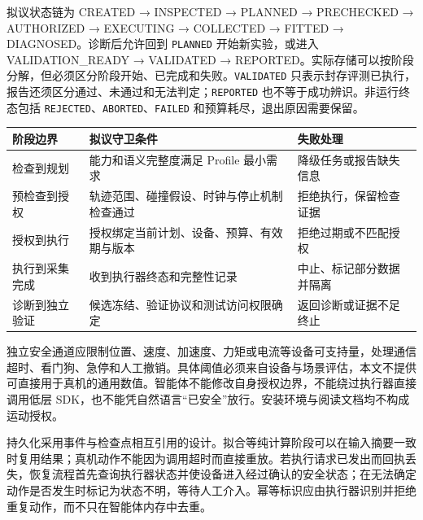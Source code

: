 \documentclass[
  chinese,
  11pt,
  a4paper,
  fontset=fandol]{ctexart}
\newcounter{none} %
\begin{document}
拟议状态链为 CREATED → INSPECTED → PLANNED → PRECHECKED → AUTHORIZED →
EXECUTING → COLLECTED → FITTED → DIAGNOSED。诊断后允许回到
\texttt{PLANNED} 开始新实验，或进入 VALIDATION\_READY → VALIDATED →
REPORTED。实际存储可以按阶段分解，但必须区分阶段开始、已完成和失败。\texttt{VALIDATED}
只表示封存评测已执行，报告还须区分通过、未通过和无法判定；\texttt{REPORTED}
也不等于成功辨识。非运行终态包括
\texttt{REJECTED}、\texttt{ABORTED}、\texttt{FAILED}
和预算耗尽，退出原因需要保留。

{\def\LTcaptype{none} %
\begin{longtable}[]{@{}
  >{\raggedright\arraybackslash}p{}
  >{\raggedright\arraybackslash}p{}
  >{\raggedright\arraybackslash}p{}@{}}
\toprule\noalign{}
\begin{minipage}[b]{\linewidth}\raggedright
阶段边界
\end{minipage} & \begin{minipage}[b]{\linewidth}\raggedright
拟议守卫条件
\end{minipage} & \begin{minipage}[b]{\linewidth}\raggedright
失败处理
\end{minipage} \\
\midrule\noalign{}
\endhead
\bottomrule\noalign{}
\endlastfoot
检查到规划 & 能力和语义完整度满足 Profile 最小需求 &
降级任务或报告缺失信息 \\
预检查到授权 & 轨迹范围、碰撞假设、时钟与停止机制检查通过 &
拒绝执行，保留检查证据 \\
授权到执行 & 授权绑定当前计划、设备、预算、有效期与版本 &
拒绝过期或不匹配授权 \\
执行到采集完成 & 收到执行器终态和完整性记录 &
中止、标记部分数据并隔离 \\
诊断到独立验证 & 候选冻结、验证协议和测试访问权限确定 &
返回诊断或证据不足终止 \\
\end{longtable}
}

独立安全通道应限制位置、速度、加速度、力矩或电流等设备可支持量，处理通信超时、看门狗、急停和人工撤销。具体阈值必须来自设备与场景评估，本文不提供可直接用于真机的通用数值。智能体不能修改自身授权边界，不能绕过执行器直接调用低层
SDK，也不能凭自然语言``已安全''放行。安装环境与阅读文档均不构成运动授权。

持久化采用事件与检查点相互引用的设计。拟合等纯计算阶段可以在输入摘要一致时复用结果；真机动作不能因为调用超时而直接重放。若执行请求已发出而回执丢失，恢复流程首先查询执行器状态并使设备进入经过确认的安全状态；在无法确定动作是否发生时标记为状态不明，等待人工介入。幂等标识应由执行器识别并拒绝重复动作，而不只在智能体内存中去重。
\end{document}
